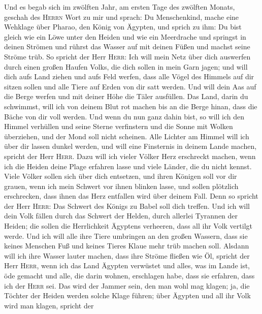 Und es begab sich im zwölften Jahr, am ersten Tage des
zwölften Monats, geschah des \textsc{Herrn} Wort zu mir und sprach:
 Du Menschenkind, mache eine Wehklage über Pharao, den
König von Ägypten, und sprich zu ihm: Du bist gleich wie ein Löwe unter
den Heiden und wie ein Meerdrache und springst in deinen Strömen und
rührst das Wasser auf mit deinen Füßen und machst seine Ströme trüb.
 So spricht der Herr \textsc{Herr}: Ich will mein Netz
über dich auswerfen durch einen großen Haufen Volks, die dich sollen in
mein Garn jagen;  und will dich aufs Land ziehen und aufs
Feld werfen, dass alle Vögel des Himmels auf dir sitzen sollen und alle
Tiere auf Erden von dir satt werden.  Und will dein Aas
auf die Berge werfen und mit deiner Höhe die Täler ausfüllen.
 Das Land, darin du schwimmst, will ich von deinem Blut
rot machen bis an die Berge hinan, dass die Bäche von dir voll werden.
 Und wenn du nun ganz dahin bist, so will ich den Himmel
verhüllen und seine Sterne verfinstern und die Sonne mit Wolken
überziehen, und der Mond soll nicht scheinen.  Alle
Lichter am Himmel will ich über dir lassen dunkel werden, und will eine
Finsternis in deinem Lande machen, spricht der Herr \textsc{Herr}.
 Dazu will ich vieler Völker Herz erschreckt machen, wenn
ich die Heiden deine Plage erfahren lasse und viele Länder, die du nicht
kennst.  Viele Völker sollen sich über dich entsetzen,
und ihren Königen soll vor dir grauen, wenn ich mein Schwert vor ihnen
blinken lasse, und sollen plötzlich erschrecken, dass ihnen das Herz
entfallen wird über deinem Fall.  Denn so spricht der
Herr \textsc{Herr}: Das Schwert des Königs zu Babel soll dich treffen.
 Und ich will dein Volk fällen durch das Schwert der
Helden, durch allerlei Tyrannen der Heiden; die sollen die Herrlichkeit
Ägyptens verheeren, dass all ihr Volk vertilgt werde. 
Und ich will alle ihre Tiere umbringen an den großen Wassern, dass sie
keines Menschen Fuß und keines Tieres Klaue mehr trüb machen soll.
 Alsdann will ich ihre Wasser lauter machen, dass ihre
Ströme fließen wie Öl, spricht der Herr \textsc{Herr}, 
wenn ich das Land Ägypten verwüstet und alles, was im Lande ist, öde
gemacht und alle, die darin wohnen, erschlagen habe, dass sie erfahren,
dass ich der \textsc{Herr} sei.  Das wird der Jammer
sein, den man wohl mag klagen; ja, die Töchter der Heiden werden solche
Klage führen; über Ägypten und all ihr Volk wird man klagen, spricht der
